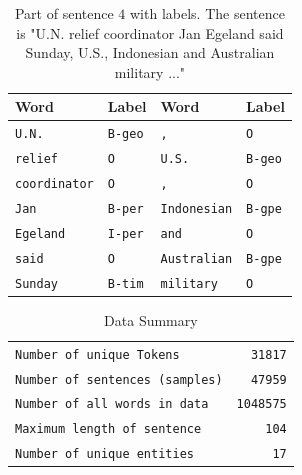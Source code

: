 \documentclass[sigconf, nonacm, natbib, screen, balance=False]{acmart}
\begin{document}
\begin{table}
  \caption{Part of sentence $4$ with labels. The sentence is "U.N. relief coordinator Jan Egeland said Sunday, U.S., Indonesian and Australian military ..."}
  \label{tbl:sent4entites}
  \begin{tabular}{ll|ll}  
    \hline
    Word & Label & Word & Label \\\hline
    \verb!U.N.! & \verb!B-geo! & \verb!,! & \verb!O! \\
    \verb!relief! & \verb!O! & \verb!U.S.! & \verb!B-geo! \\
    \verb!coordinator! & \verb!O! & \verb!,! & \verb!O! \\
    \verb!Jan! & \verb!B-per! &  \verb!Indonesian! & \verb!B-gpe!\\
    \verb!Egeland! & \verb!I-per! & \verb!and! & \verb!O! \\
    \verb!said! & \verb!O! & \verb!Australian! & \verb!B-gpe!\\
    \verb!Sunday! & \verb!B-tim! & \verb!military! & \verb!O! \\\hline
  \end{tabular}
\end{table}

\begin{table}
  \caption{Data Summary}
  \label{tbl:data_summary}
  \begin{tabular}{l|r}  
    \hline
    \verb!Number of unique Tokens! & \verb!31817! \\
    \verb!Number of sentences (samples)! & \verb!47959! \\
    \verb!Number of all words in data! & \verb!1048575! \\
    \verb!Maximum length of sentence! & \verb!104! \\
    \verb!Number of unique entities! & \verb!17! \\\hline
  \end{tabular}
\end{table}
\end{document}

